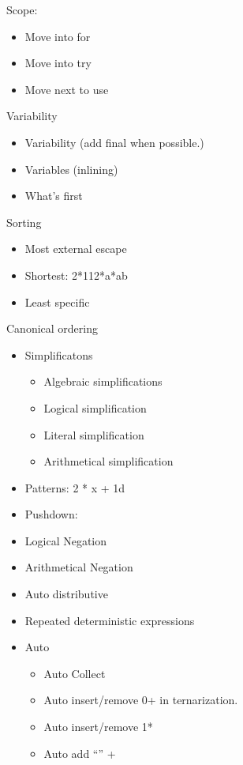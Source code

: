 \begin{itemize}
  Scope:
  \begin{itemize}
    \item Move into for
    \item Move into try
    \item Move next to use
  \end{itemize}
  Variability
  \begin{itemize}
    \item Variability (add final when possible.)
    \item Variables (inlining)
    \item What’s first
  \end{itemize}
  Sorting
  \begin{itemize}
    \item Most external escape
    \item Shortest: 2*112*a*ab
    \item Least specific
  \end{itemize}
  Canonical ordering
  \begin{itemize}
    \item Simplificatons
          \begin{itemize}
            \item Algebraic simplifications
            \item Logical simplification
            \item Literal simplification
            \item Arithmetical simplification
          \end{itemize}
    \item Patterns: 2 * x + 1d
    \item Pushdown:
    \item Logical Negation
    \item Arithmetical Negation
    \item Auto distributive
    \item Repeated deterministic expressions
    \item Auto
          \begin{itemize}
            \item Auto Collect
            \item Auto insert/remove 0+ in ternarization.
            \item Auto insert/remove 1*
            \item Auto add “” +
          \end{itemize}
  \end{itemize}


\end{itemize}
